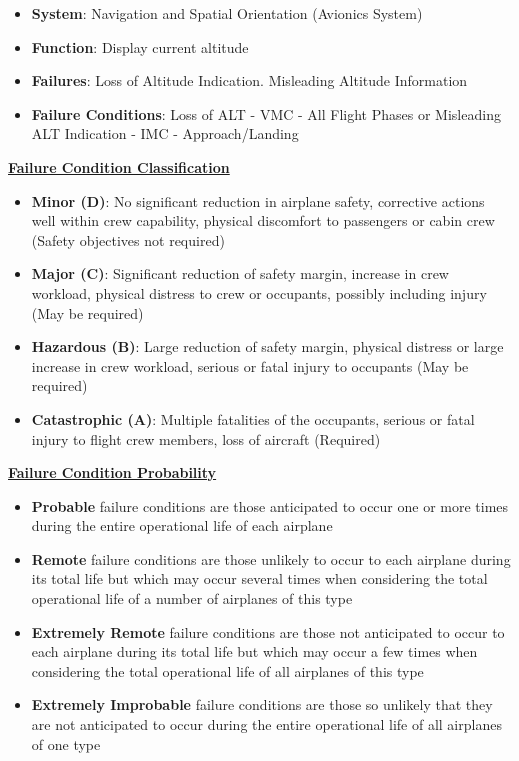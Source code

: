 \documentclass[9pt, landscape, fleqn]{scrartcl}
\begin{document}
\begin{multicols*}{3}
\begin{itemize}
    \item \textbf{System}: Navigation and Spatial Orientation (Avionics System)
    \item \textbf{Function}: Display current altitude 
    \item \textbf{Failures}: Loss of Altitude Indication. Misleading Altitude Information 
    \item \textbf{Failure Conditions}: Loss of ALT - VMC - All Flight Phases or Misleading ALT Indication - IMC - Approach/Landing 
\end{itemize}
\underline{\textbf{Failure Condition Classification}}
\begin{itemize}
    \item \textbf{Minor (D)}: No significant reduction in airplane safety, corrective actions well within crew capability, physical discomfort to passengers or cabin crew (Safety objectives not required)
    \item \textbf{Major (C)}: Significant reduction of safety margin, increase in crew workload, physical distress to crew or occupants, possibly including injury (May be required)
    \item \textbf{Hazardous (B)}: Large reduction of safety margin, physical distress or large increase in crew workload, serious or fatal injury to occupants (May be required)
    \item \textbf{Catastrophic (A)}: Multiple fatalities of the occupants, serious or fatal injury to flight crew members, loss of aircraft (Required)
\end{itemize}
\underline{\textbf{Failure Condition Probability}}
\begin{itemize}
    \item \textbf{Probable} failure conditions are those anticipated to occur one or more times during the entire operational life of each airplane
    \item \textbf{Remote} failure conditions are those unlikely to occur to each airplane during its total life but which may occur several times when considering the total operational life of a number of airplanes of this type
    \item \textbf{Extremely Remote} failure conditions are those not anticipated to occur to each airplane during its total life but which may occur a few times when considering the total operational life of all airplanes of this type
    \item \textbf{Extremely Improbable} failure conditions are those so unlikely that they are not anticipated to occur during the entire operational life of all airplanes of one type

\end{itemize}
\end{multicols*}
\end{document}
